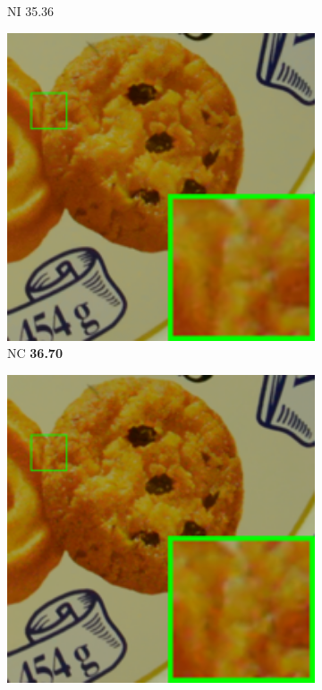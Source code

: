\begin{figure}
\begin{subfigure}[t]{0.19\textwidth}
		\caption{NI 35.36}
    \end{subfigure}
    \hfill
    \begin{subfigure}[t]{0.19\textwidth}
        \centering
        \includegraphics[width=1\textwidth]{images/guided/cc15/resize_br_NC_d600_iso3200_2_real.png}
		\caption{NC \textbf{36.70}}
    \end{subfigure}
    \hfill
    \begin{subfigure}[t]{0.19\textwidth}
        \centering
        \includegraphics[width=1\textwidth]{images/guided/cc15/resize_br_CCNoise_d600_iso3200_2.png}

\end{subfigure}
\end{figure}
